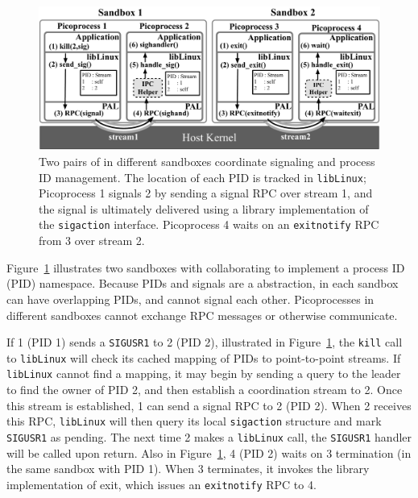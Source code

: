 \begin{figure}
\centering
\includegraphics[width=6in]{graphene/figures/coordination.pdf}
\caption[Sandboxing inter-process cordination in \sysname{}]
{Two pairs of \sysname{} \picoprocs{} in different sandboxes 
coordinate signaling and process ID management.
The location of each PID is tracked in {\tt libLinux}; Picoprocess 1 signals
\picoproc{} 2 by sending a signal RPC over stream 1,
and the signal is ultimately delivered using a 
library implementation of the {\tt sigaction} interface. Picoprocess 4 
waits on an {\tt exitnotify} RPC from  \picoproc{} 3 over stream 2. }
\label{fig:graphene:coordination}
\end{figure}

Figure~\ref{fig:graphene:coordination} illustrates two sandboxes with \picoprocs{}
collaborating to implement a process ID (PID) namespace.  
Because PIDs and signals are a \libos{} abstraction,
\picoprocs{} in 
each sandbox can have overlapping PIDs, and
cannot signal each other.
Picoprocesses in different sandboxes cannot 
exchange RPC messages or otherwise communicate.


If \picoproc{} 1 (PID 1) sends a {\tt SIGUSR1} to \picoproc{} 2 (PID 2), illustrated in Figure~\ref{fig:graphene:coordination},
the {\tt kill} call to {\tt libLinux} will check its cached mapping of PIDs to 
point-to-point streams.
If {\tt libLinux} cannot find a mapping, it may begin by sending a query to the leader
to find the owner of PID 2,
and then establish a coordination stream to \picoproc{} 2.
Once this stream is established, \picoproc{} 1 can send a  
signal RPC to \picoproc{} 2 (PID 2).
When \picoproc{} 2 receives this RPC, 
{\tt libLinux} will then query its local {\tt sigaction} 
structure and mark {\tt SIGUSR1} as pending.
The next time \picoproc{} 2 makes a {\tt libLinux} call,
the {\tt SIGUSR1} handler will be called upon return. Also in Figure~\ref{fig:graphene:coordination}, \picoproc{} 4 (PID 2) waits on 
\picoproc{} 3 termination (in the same sandbox with PID 1). When \picoproc{} 3 terminates, it invokes the library implementation of exit, which issues
an {\tt exitnotify} RPC to \picoproc{} 4.

